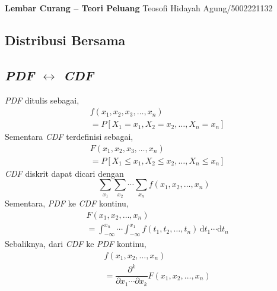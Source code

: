\documentclass[a4paper,extrafontsizes, 9pt]{memoir}
\begin{document}
	\begin{center}
		\textbf{{Lembar Curang -- Teori Peluang}} \hfill Teosofi Hidayah Agung/5002221132
	\end{center}
	
	\begin{multicols}{3}			
		\section*{\small Distribusi Bersama}
			\subsection*{\small \textsl{PDF} $\leftrightarrow$ \textsl{CDF}}
				\textsl{PDF} ditulis sebagai,
					\begin{align*}
						& f\left(x_{1}, x_{2}, x_{3}, \ldots, x_{n}\right)\\
						& = P\left[X_{1} = x_{1}, X_{2} = x_{2}, \ldots, X_{n} = x_{n}\right]
					\end{align*}
				Sementara \textsl{CDF} terdefinisi sebagai,
					\begin{align*}
						& F\left(x_{1}, x_{2}, x_{3}, \ldots, x_{n}\right)\\
						& = P\left[X_{1} \leq x_{1}, X_{2} \leq x_{2}, \ldots, X_{n} \leq x_{n}\right]
					\end{align*}
				\textsl{CDF} diskrit dapat dicari dengan
					\[
						\sum_{x_{1}}\sum_{x_{2}}\cdots\sum_{x_{n}}f\left(x_{1}, x_{2}, \ldots, x_{n}\right)
					\]					
				Sementara, \textsl{PDF} ke \textsl{CDF} kontinu,
					\begin{align*}
						& F\left(x_{1}, x_{2}, \ldots, x_{n}\right)\\
						& = \int_{-\infty}^{x_{n}}\cdots\int_{-\infty}^{x_{1}}f\left(t_{1}, t_{2}, \ldots, t_{n}\right)\,\mathrm{d}t_{1}\cdots\mathrm{d}t_{n}
					\end{align*}
				Sebaliknya, dari \textsl{CDF} ke \textsl{PDF} kontinu,
					\begin{align*}
						& f\left(x_{1}, x_{2}, \ldots, x_{n}\right)\\
						& = \dfrac{\partial^{k}}{\partial x_{1}\cdots \partial x_{k}}F\left(x_{1}, x_{2}, \ldots, x_{n}\right)
					\end{align*}
					

\end{multicols}
\end{document}

